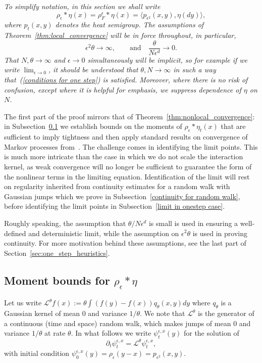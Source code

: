\documentclass[EJP]{ejpecp} %
\begin{document}
{\em To simplify notation, in this section we shall write 
$$\rho_\epsilon*\eta(x)=\rho_F^\epsilon*\eta(x)
=\langle p_{\epsilon^2}(x,y),\eta(dy)\rangle,$$
where $p_t(x,y)$ denotes the heat semigroup. 
The assumptions of Theorem~\ref{thm:local_convergence} will be in force throughout,
in particular,
\begin{equation}
    \label{conditions for one step}
	\epsilon^2\theta\to\infty, \qquad\mbox{and}\quad \frac{\theta}{N\epsilon^d}\to 0.
\end{equation}
That $N, \theta\to \infty$ and $\epsilon\to 0$ simultaneously will be 
implicit, so for example if we write $\lim_{\epsilon\to 0}$, it should be 
understood that $\theta, N\to\infty$ in such a way 
that~(\ref{conditions for one step}) is satisfied. 
Moreover, where there is no risk of confusion, except where it is helpful
for emphasis, we 
suppress dependence of $\eta$ on $N$.}

The first part of the proof mirrors that of Theorem~\ref{thm:nonlocal_convergence}:
in Subsection~\ref{bounds on rhoepsilon}
we establish bounds on the moments of $\rho_\epsilon*\eta_t(x)$ that are sufficient to
imply tightness and then apply standard results on 
convergence of Markov processes from~\cite{ethier/kurtz:1986}. 
The challenge
comes in identifying the limit points. This is much more intricate than the case in 
which we do not scale the interaction kernel, as weak convergence will no longer
be sufficient to guarantee the form of the nonlinear terms in the limiting equation.
Identification of the limit will rest on regularity inherited from continuity 
estimates for a random walk with Gaussian jumps which we prove in 
Subsection~\ref{continuity for random walk}, before
identifying the limit points in Subsection~\ref{limit in onestep case}.

Roughly speaking, the assumption that $\theta/N\epsilon^d$ is small 
is used in ensuring a well-defined and deterministic limit,
while the assumption on $\epsilon^2 \theta$ is used in proving continuity.
For more motivation behind these assumptions,
see the last part of Section~\ref{sec:one_step_heuristics}.

\subsection{Moment bounds for $\rho_\epsilon*\eta$}
\label{bounds on rhoepsilon}

Let us write $\mathcal{L}^\theta f(x) := \theta \int (f(y)-f(x))q_\theta(x,y) dy$ 
where $q_\theta$ is a Gaussian kernel of mean $0$ and variance $1/\theta$. 
We note that $\mathcal{L}^\theta$ is the generator of a continuous (time and 
space) random walk, which makes jumps of mean $0$ and variance $1/\theta$ at rate $\theta$.
In what follows we write $\psi_t^{\epsilon, x}(y)$ for the solution of
\begin{equation}
    \partial_t \psi_t^{\epsilon,x}
    =
    \mathcal{L}^\theta \psi_t^{\epsilon, x},
    \label{AlmostHeatEquation}
\end{equation}
with initial condition 
$\psi_0^{\epsilon,x}(y) = \rho_\epsilon(y-x) =p_{\epsilon^2}(x,y)$.
\end{document}
